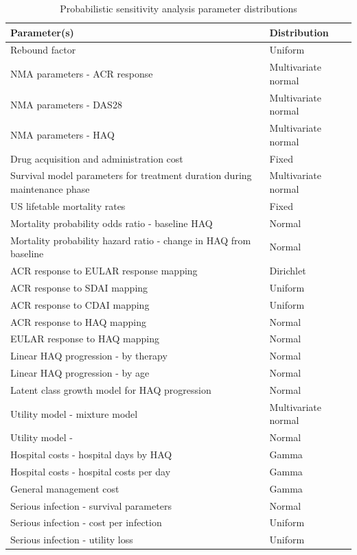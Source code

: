 \documentclass[11pt,final,fleqn]{article}
\theoremstyle{plain}
\begin{document}
\begin{table}[!ht] 
\begin{center}
\begin{threeparttable}
\caption{Probabilistic sensitivity analysis parameter distributions} \label{tbl:psa-dists}
\def\arraystretch{1.5}
\begin{tabularx}{\textwidth}{@{\extracolsep{\fill}}p{.65 \linewidth}p{.35 \linewidth}}
\hline
\multicolumn{1}{l}{Parameter(s)} & \multicolumn{1}{l}{Distribution} \\
\hline
Rebound factor & Uniform\\
NMA parameters - ACR response & Multivariate normal \\
NMA parameters - DAS28 & Multivariate normal \\
NMA parameters - HAQ & Multivariate normal \\
Drug acquisition and administration cost & Fixed \\
Survival model parameters for treatment duration during maintenance phase & Multivariate normal \\
US lifetable mortality rates & Fixed \\
Mortality probability odds ratio - baseline HAQ & Normal \\
Mortality probability hazard ratio - change in HAQ from baseline & Normal\\
ACR response to EULAR response mapping & Dirichlet \\
ACR response to SDAI mapping & Uniform \\
ACR response to CDAI mapping & Uniform \\
ACR response to HAQ mapping & Normal \\
EULAR response to HAQ mapping & Normal \\
Linear HAQ progression - by therapy & Normal \\
Linear HAQ progression - by age & Normal \\
Latent class growth model for HAQ progression & Normal \\
Utility model - \cite{alava2013relationship} mixture model & Multivariate normal \\
Utility model - \citet{wailoo2006modeling} & Normal \\
Hospital costs - hospital days by HAQ & Gamma \\
Hospital costs - hospital costs per day & Gamma \\
General management cost & Gamma \\
Serious infection - survival parameters & Normal \\
Serious infection - cost per infection & Uniform \\
Serious infection - utility loss & Uniform \\
\hline
\end{tabularx}
\scriptsize
\end{threeparttable}
\end{center}
\end{table}
\end{document}
